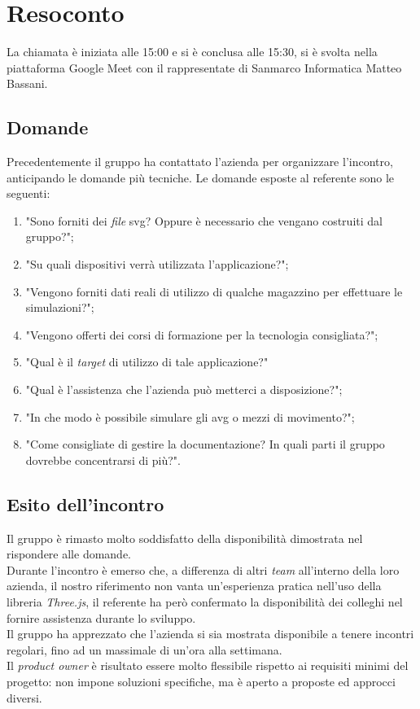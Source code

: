 \section{Resoconto}
La chiamata è iniziata alle 15:00 e si è conclusa alle 15:30, si è svolta nella piattaforma Google Meet con il rappresentate di Sanmarco Informatica Matteo Bassani.
\subsection{Domande}
Precedentemente il gruppo ha contattato l'azienda per organizzare l'incontro, anticipando le domande più tecniche.
Le domande esposte al referente sono le seguenti:
\begin{enumerate}
    \item "Sono forniti dei \textit{file} svg? Oppure è necessario che vengano costruiti dal gruppo?";
    \item "Su quali dispositivi verrà utilizzata l'applicazione?";
    \item "Vengono forniti dati reali di utilizzo di qualche magazzino per effettuare le simulazioni?";
    \item "Vengono offerti dei corsi di formazione per la tecnologia consigliata?";
	\item "Qual è il \textit{target} di utilizzo di tale applicazione?"
    \item "Qual è l'assistenza che l'azienda può metterci a disposizione?";
    \item "In che modo è possibile simulare gli avg o mezzi di movimento?";
    \item "Come consigliate di gestire la documentazione? In quali parti il gruppo dovrebbe concentrarsi di più?".
\end{enumerate}

\subsection{Esito dell'incontro}
Il gruppo è rimasto molto soddisfatto della disponibilità dimostrata nel rispondere alle domande. \\ 
Durante l'incontro è emerso che, a differenza di altri \textit{team} all'interno della loro azienda, il nostro riferimento non vanta un'esperienza pratica nell'uso della libreria \textit{Three.js}, il referente ha però confermato la disponibilità dei colleghi nel fornire assistenza durante lo sviluppo. \\
Il gruppo ha apprezzato che l'azienda si sia mostrata disponibile a tenere incontri regolari, fino ad un massimale di un'ora alla settimana. \\
Il \textit{product owner} è risultato essere molto flessibile rispetto ai requisiti minimi del progetto: non impone soluzioni specifiche, ma è aperto a proposte ed approcci diversi. \\


